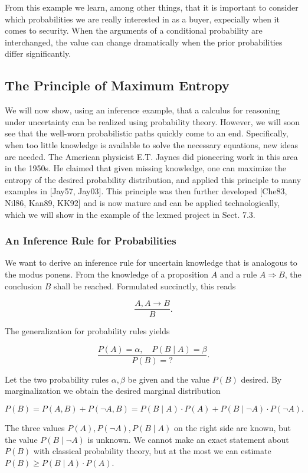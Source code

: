 \documentclass[10pt]{article}
\begin{document}
From this example we learn, among other things, that it is important to consider which probabilities we are really interested in as a buyer, expecially when it comes to security. When the arguments of a conditional probability are interchanged, the value can change dramatically when the prior probabilities differ significantly.

\subsection*{The Principle of Maximum Entropy}
We will now show, using an inference example, that a calculus for reasoning under uncertainty can be realized using probability theory. However, we will soon see that the well-worn probabilistic paths quickly come to an end. Specifically, when too little knowledge is available to solve the necessary equations, new ideas are needed. The American physicist E.T. Jaynes did pioneering work in this area in the 1950s. He claimed that given missing knowledge, one can maximize the entropy of the desired probability distribution, and applied this principle to many examples in [Jay57, Jay03]. This principle was then further developed [Che83, Nil86, Kan89, KK92] and is now mature and can be applied technologically, which we will show in the example of the lexmed project in Sect. 7.3.

\subsubsection*{An Inference Rule for Probabilities}
We want to derive an inference rule for uncertain knowledge that is analogous to the modus ponens. From the knowledge of a proposition $A$ and a rule $A \Rightarrow B$, the conclusion $B$ shall be reached. Formulated succinctly, this reads

$$
\frac{A, A \rightarrow B}{B} .
$$

The generalization for probability rules yields

$$
\frac{P(A)=\alpha, \quad P(B \mid A)=\beta}{P(B)=?} .
$$

Let the two probability rules $\alpha, \beta$ be given and the value $P(B)$ desired. By marginalization we obtain the desired marginal distribution

$$
P(B)=P(A, B)+P(\neg A, B)=P(B \mid A) \cdot P(A)+P(B \mid \neg A) \cdot P(\neg A) .
$$

The three values $P(A), P(\neg A), P(B \mid A)$ on the right side are known, but the value $P(B \mid \neg A)$ is unknown. We cannot make an exact statement about $P(B)$ with classical probability theory, but at the most we can estimate $P(B) \geq P(B \mid A) \cdot P(A)$.
\end{document}
